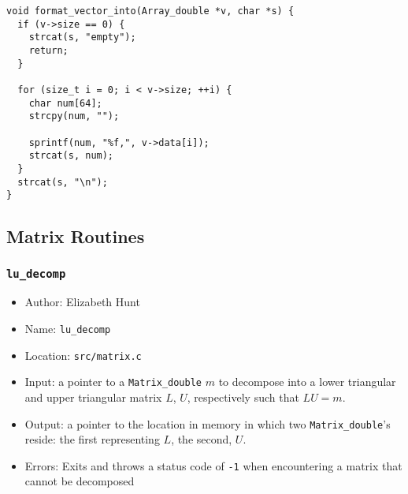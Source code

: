 \documentclass[11pt]{article}
\begin{document}
\begin{verbatim}
void format_vector_into(Array_double *v, char *s) {
  if (v->size == 0) {
    strcat(s, "empty");
    return;
  }

  for (size_t i = 0; i < v->size; ++i) {
    char num[64];
    strcpy(num, "");

    sprintf(num, "%f,", v->data[i]);
    strcat(s, num);
  }
  strcat(s, "\n");
}
\end{verbatim}

\subsection{Matrix Routines}
\label{sec:org2354147}
\subsubsection{\texttt{lu\_decomp}}
\label{sec:org3690faa}
\begin{itemize}
\item Author: Elizabeth Hunt
\item Name: \texttt{lu\_decomp}
\item Location: \texttt{src/matrix.c}
\item Input: a pointer to a \texttt{Matrix\_double} \(m\) to decompose into a lower triangular and upper triangular
matrix \(L\), \(U\), respectively such that \(LU = m\).
\item Output: a pointer to the location in memory in which two \texttt{Matrix\_double}'s reside: the first
representing \(L\), the second, \(U\).
\item Errors: Exits and throws a status code of \texttt{-1} when encountering a matrix that cannot be
decomposed
\end{itemize}
\end{document}
